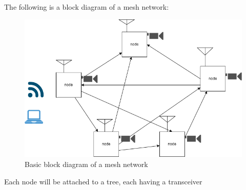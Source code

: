 	The following is a block diagram of a mesh network:
	\begin{figure}[h!]
	    \begin{center}			
	    \includegraphics[width=0.5\linewidth]{Images/basic mesh network diagram.png}\par
	    \caption{Basic block diagram of a mesh network}
	
	    \label{Basic block diagram of a mesh network}
	     \end{center}
	\end{figure}

	Each node will be attached to a tree, each having a transceiver